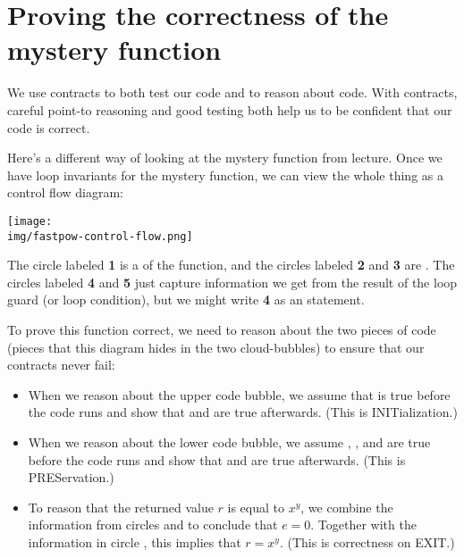\section*{Proving the correctness of the mystery function%
}

We use contracts to both test our code and to reason about code. With
contracts, careful point-to reasoning and good testing both help us to
be confident that our code is correct.

Here's a different way of looking at the mystery function from lecture.
Once we have loop invariants for the mystery function, we can view the
whole thing as a control flow diagram:
\begin{center}
\texttt{[image: \\img/fastpow-control-flow.png]}
\end{center}
\begin{sloppypar}
The circle labeled \textbf{1} is a  of
the function, and the circles labeled \textbf{2} and \textbf{3} are
. The circles labeled \textbf{4} and
\textbf{5} just capture information we get from the result of the loop
guard (or loop condition), but we might write \textbf{4} as an
 statement.
\end{sloppypar}

\enlargethispage{5ex}
To prove this function correct, we need to reason about the two pieces
of code (pieces that this diagram hides in the two cloud-bubbles) to
ensure that our contracts never fail:
\begin{itemize}
  \item When we reason about the upper code bubble, we assume that
     is true before the code runs and show that
     and
     are true afterwards.  (This is INITialization.)
  \item When we reason about the lower code bubble, we assume
    , , and
     are true before the
    code runs and show that  and
     are true
    afterwards.  (This is PREServation.)
  \item To reason that the returned value $r$ is equal to $x^y$, we
    combine the information from circles  and
       to conclude that $e = 0$.  Together with
    the information in circle
    , this implies that $r = x^y$.
    (This is correctness on EXIT.)
\end{itemize}

